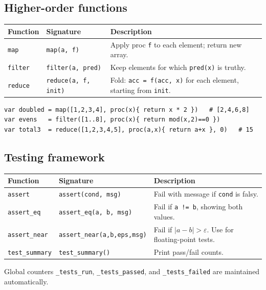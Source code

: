 \documentclass[11pt,a4paper]{article}
\begin{document}
\subsection{Higher-order functions}

\begin{longtable}{@{}L{3.5cm}L{5cm}L{6.5cm}@{}}
\toprule
\textbf{Function} & \textbf{Signature} & \textbf{Description} \\
\midrule
\endhead
\texttt{map}    & \texttt{map(a, f)}           & Apply proc \texttt{f} to each element; return new array. \\
\texttt{filter} & \texttt{filter(a, pred)}     & Keep elements for which \texttt{pred(x)} is truthy. \\
\texttt{reduce} & \texttt{reduce(a, f, init)}  & Fold: \texttt{acc = f(acc, x)} for each element, starting from \texttt{init}. \\
\bottomrule
\end{longtable}

\begin{lstlisting}
var doubled = map([1,2,3,4], proc(x){ return x * 2 })   # [2,4,6,8]
var evens   = filter([1..8], proc(x){ return mod(x,2)==0 })
var total3  = reduce([1,2,3,4,5], proc(a,x){ return a+x }, 0)   # 15
\end{lstlisting}

\subsection{Testing framework}

\begin{longtable}{@{}L{3.5cm}L{5cm}L{6.5cm}@{}}
\toprule
\textbf{Function} & \textbf{Signature} & \textbf{Description} \\
\midrule
\endhead
\texttt{assert}      & \texttt{assert(cond, msg)}      & Fail with message if \texttt{cond} is falsy. \\
\texttt{assert\_eq}  & \texttt{assert\_eq(a, b, msg)}  & Fail if \texttt{a != b}, showing both values. \\
\texttt{assert\_near}& \texttt{assert\_near(a,b,eps,msg)} & Fail if $|a - b| > \varepsilon$. Use for floating-point tests. \\
\texttt{test\_summary} & \texttt{test\_summary()}     & Print pass/fail counts. \\
\bottomrule
\end{longtable}

Global counters \texttt{\_tests\_run}, \texttt{\_tests\_passed}, and
\texttt{\_tests\_failed} are maintained automatically.
\end{document}
